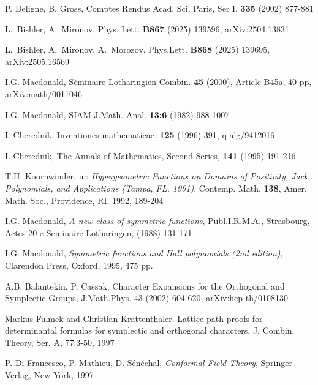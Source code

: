 \documentclass{article}
\begin{document}
\begin{thebibliography}{12}
 P. Deligne, B. Gross, %
Comptes Rendus Acad. Sci. Paris, Ser I, {\bf 335} (2002) 877-881

 L.~Bishler, A.~Mironov,
Phys. Lett. \textbf{B867} (2025) 139596,
arXiv:2504.13831


 L.~Bishler, A.~Mironov, A.~Morozov,
Phys.Lett. \textbf{B868} (2025) 139695,
arXiv:2505.16569

 I.G. Macdonald, %
S\`eminaire Lotharingien Combin. {\bf 45} (2000), Article B45a, 40 pp, arXiv:math/0011046

 I.G. Macdonald, %
SIAM J.Math. Anal. {\bf 13:6} (1982) 988-1007

 I. Cherednik, %
Inventiones mathematicae, {\bf 125} (1996) 391, q-alg/9412016

 I. Cherednik, %
The Annals of Mathematics, Second Series, {\bf 141} (1995) 191-216

 T.H. Koornwinder, %
in: {\sl Hypergeometric Functions on
Domains of Positivity, Jack Polynomials, and Applications (Tampa, FL, 1991)}, Contemp. Math. {\bf 138}, Amer. Math. Soc., Providence, RI, 1992, 189-204

 I.G. Macdonald, {\sl A new class of symmetric functions}, Publ.I.R.M.A., Strasbourg, Actes 20-e Seminaire Lotharingen, (1988) 131-171

 I.G. Macdonald, {\sl Symmetric functions and Hall polynomials (2nd edition)}, Clarendon Press, Oxford, 1995, 475 pp.

 A.B. Balantekin, P. Cassak, Character Expansions for the Orthogonal and Symplectic Groups, J.Math.Phys. 43 (2002) 604-620, 	arXiv:hep-th/0108130

 Markus Fulmek and Christian Krattenthaler. Lattice path proofs for determinantal formulas for symplectic and orthogonal characters. J. Combin. Theory, Ser. A, 77:3-50, 1997


  P. Di Francesco, P. Mathieu, D. S\'{e}n\'{e}chal, {\sl Conformal Field Theory}, Springer-Verlag,
New York, 1997


\end{thebibliography}
\end{document}
